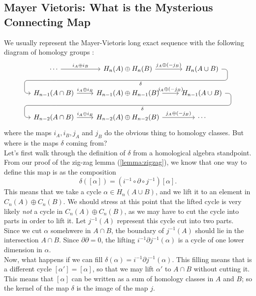 \begin{doubledpage}
\subsection*{Mayer Vietoris: What is the Mysterious Connecting Map}
We usually represent the Mayer-Vietoris long exact sequence with the following diagram of homology groups :
\[\begin{tikzcd}
			\cdots \arrow{r}{i_A\oplus i_B} \arrow[draw=none]{d}[name=Z, shape=coordinate]{}&H_n(A)\oplus H_n(B) \arrow{r}{j_A\oplus (-j_B)} & H_n(A\cup B) \arrow[rounded corners,to path={ -- ([xshift=2ex]\tikztostart.east)|- (Z) [near end]\tikztonodes-| ([xshift=-2ex]\tikztotarget.west)-- (\tikztotarget)}]{dll}{\delta} \\
			H_{n-1}(A\cap B) \arrow{r}{i_A\oplus i_B} \arrow[draw=none]{d}[name=Z, shape=coordinate]{}&H_{n-1}(A)\oplus H_{n-1} (B)\arrow{r}{j_A\oplus (-j_B)} & H_{n-1}(A\cup B) \arrow[rounded corners,to path={ -- ([xshift=2ex]\tikztostart.east)|- (Z) [near end]\tikztonodes-| ([xshift=-2ex]\tikztotarget.west)-- (\tikztotarget)}]{dll}{\delta} \\
			H_{n-2}(A\cap B)\arrow{r}{i_A\oplus i_B} &H_{n-2}(A)\oplus H_{n-2}(B)\arrow{r}{j_A\oplus (-j_B)} &\cdots 
\end{tikzcd}\]
where the maps $i_A, i_B, j_A$ and $j_B$ do the obvious thing to homology classes. But where is the maps $\delta$ coming from?\\
Let's first walk through the definition of $\delta$ from a homological algebra standpoint. From our proof of the zig-zag lemma (\ref{lemma:zigzag}), we know that one way to define this map is as the composition 
\[\delta([\alpha])= ( i^{-1}\circ \partial \circ j^{-1})[\alpha].\]
This means that we take a cycle $\alpha\in H_n(A\cup B)$, and we lift it to an element in $C_n(A)\oplus C_n(B)$. We should stress at this point that the lifted cycle is very likely \emph{not} a cycle in $C_n(A)\oplus C_n(B)$, as we may have to cut the cycle into parts in order to lift it. Let $j^{-1}(A)$ represent this cycle cut into two parts. \\
Since we cut $\alpha$ somehwere in $A\cap B$, the boundary of $j^{-1}(A)$ should lie in the intersection $A\cap B$. Since $\partial \partial =0$, the lifting $i^{-1}\partial j^{-1}(\alpha)$ is a cycle of one lower dimension in $\alpha$. \\
Now, what happens if we can fill $\delta(\alpha)=i^{-1}\partial j^{-1}(\alpha)$. This filling means that is a different cycle $[\alpha']=[\alpha]$, so that we may lift $\alpha'$ to $A\cap B$ without cutting it. This means that $[\alpha]$ can be written as a sum of homology classes in $A$ and $B$; so the kernel of the map $\delta$ is the image of the map $j$.\\
\newpage

\end{doubledpage}
